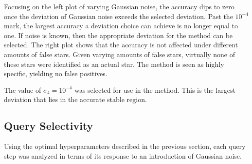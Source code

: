 Focusing on the left plot of varying Gaussian noise, the accuracy dips to zero once the deviation of Gaussian noise
exceeds the selected deviation.
Past the $10^{-4}$ mark, the largest accuracy a deviation choice can achieve is no longer equal to one.
If noise is known, then the appropriate deviation for the  method can be selected.
The right plot shows that the accuracy is not affected under different amounts of false stars.
Given varying amounts of false stars, virtually none of these stars were identified as an actual star.
The  method is seen as highly specific, yielding no false positives.

The value of $\sigma_4 = 10^{-4}$ was selected for use in the  method.
This is the largest deviation that lies in the accurate stable region.

\subsection{Query Selectivity}\label{subsec:querySelectivityResults}
Using the optimal hyperparameters described in the previous section, each query step was analyzed in terms of its
response to an introduction of Gaussian noise.


